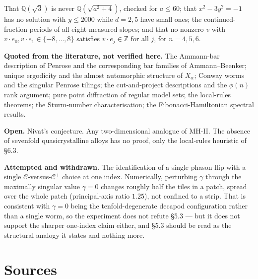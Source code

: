 \documentclass[11pt,a4paper]{article}
\newcommand{\C}{\mathcal{C}}
\newcommand{\Cp}{\mathcal{C}^{+}}
\newcommand{\Q}{\mathbb{Q}}
\newcommand{\Z}{\mathbb{Z}}
\theoremstyle{definition}
\theoremstyle{plain}
\begin{document}
That $\Q(\sqrt 3)$ is never $\Q(\sqrt{a^2+4})$, checked for $a \leq 60$; that
$x^2 - 3y^2 = -1$ has no solution with $y \leq 2000$ while $d = 2, 5$ have small
ones; the continued-fraction periods of all eight measured slopes; and that no
nonzero $v$ with $v \cdot e_0, v \cdot e_1 \in \{-8,\dots,8\}$ satisfies
$v \cdot e_j \in \Z$ for all $j$, for $n = 4, 5, 6$.

\textbf{Quoted from the literature, not verified here.} The Ammann-bar
description of Penrose and the corresponding bar families of
Ammann--Beenker; unique ergodicity and the almost automorphic structure of
$X_\alpha$; Conway worms and the singular Penrose tilings; the cut-and-project
descriptions and the $\phi(n)$ rank argument; pure point diffraction of regular
model sets; the local-rules theorems; the Sturm-number characterisation; the
Fibonacci-Hamiltonian spectral results.

\textbf{Open.} Nivat's conjecture. Any two-dimensional analogue of MH-II. The
absence of sevenfold quasicrystalline alloys has no proof, only the
local-rules heuristic of \S6.3.

\textbf{Attempted and withdrawn.} The identification of a single phason flip
with a single $\C$-versus-$\Cp$ choice at one index. Numerically, perturbing
$\gamma$ through the maximally singular value $\gamma = 0$ changes roughly half
the tiles in a patch, spread over the whole patch (principal-axis ratio $1.25$),
not confined to a strip. That is consistent with $\gamma = 0$ being the
tenfold-degenerate decapod configuration rather than a single worm, so the
experiment does not refute \S5.3 --- but it does not support the sharper
one-index claim either, and \S5.3 should be read as the structural analogy it
states and nothing more.

\section{Sources}
\end{document}
